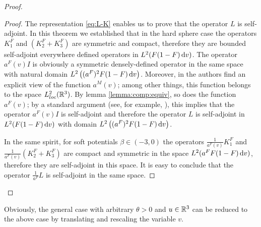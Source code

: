 \begin{proof}
\begin{proof}
The representation \eqref{eq:L-K} enables us to prove that the operator $L$ is self-adjoint. In this theorem we established that in the hard sphere case the operators $K^F_1$ and $(K^F_2+K^F_3)$ are symmetric and compact, therefore they are bounded self-adjoint everywhere defined operators in $L^2(F(1-F){\,\mathrm{d} v})$. The operator $a^F(v) I$ is obviously a symmetric densely-defined operator in the same space with natural domain $L^2\left((a^F)^2F(1-F){\,\mathrm{d} v}\right)$. Moreover, in \cite{Glassey1987Cauchy} the authors find an explicit view of the function $a^M(v)$; among other things, this function belongs to the space $L^2_{loc}({\mathbb {R}^3})$. By lemma \ref{lemma:comp:equiv}, so does the function $a^F(v)$; by a standard argument (see, for example, \cite{gitman2012self}), this implies that the operator $a^F(v)I$ is self-adjoint and therefore the operator $L$ is self-adjoint in $L^2(F(1-F){\,\mathrm{d} v})$ with domain $L^2\left((a^F)^2F(1-F){\,\mathrm{d} v}\right)$.

In the same spirit, for soft potentials $\beta\in(-3,0)$ the operators $\frac{1}{a^F(v)}K^F_1$ and $\frac{1}{a^F(v)}(K^F_2 + K^F_3)$ are compact and symmetric in the space $L^2(a^F F(1-F){\,\mathrm{d} v})$, therefore they are self-adjoint in this space. It is easy to conclude that the operator $\frac{1}{a^F}L$ is self-adjoint in the same space.

\end{proof}

\end{proof}
Obviously, the general case with arbitrary $\theta>0$ and $u\in{\mathbb {R}^3}$ can be reduced to the above case by translating and rescaling the variable $v$. 

